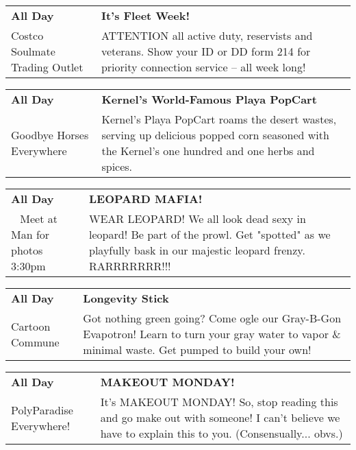 \begin{tabular}{ p{1in} p{2.2in} }
    \textbf{All Day} & \textbf{It's Fleet Week!} \\
    Costco Soulmate Trading Outlet \newline  & ATTENTION all active duty, reservists and veterans. Show your ID or DD form 214 for priority connection service -- all week long! \\
    \hline 
\end{tabular}
    
\begin{tabular}{ p{1in} p{2.2in} }
    \textbf{All Day} & \textbf{Kernel's World-Famous Playa PopCart} \\
    Goodbye Horses \newline Everywhere & Kernel's Playa PopCart roams the desert wastes, serving up delicious popped corn seasoned with the Kernel's one hundred and one herbs and spices. \\
    \hline 
\end{tabular}
    
\begin{tabular}{ p{1in} p{2.2in} }
    \textbf{All Day} & \textbf{LEOPARD MAFIA!} \\
    ~ \newline Meet at Man for photos 3:30pm & WEAR LEOPARD! We all look dead sexy in leopard! Be part of the prowl. Get "spotted" as we playfully bask in our majestic leopard frenzy. RARRRRRRR!!! \\
    \hline 
\end{tabular}
    
\begin{tabular}{ p{1in} p{2.2in} }
    \textbf{All Day} & \textbf{Longevity Stick} \\
    Cartoon Commune \newline  & Got nothing green going? Come ogle our Gray-B-Gon Evapotron! Learn to turn your gray water to vapor \& minimal waste. Get pumped to build your own! \\
    \hline 
\end{tabular}
    
\begin{tabular}{ p{1in} p{2.2in} }
    \textbf{All Day} & \textbf{MAKEOUT MONDAY!} \\
    PolyParadise \newline Everywhere! & It's MAKEOUT MONDAY! So, stop reading this and go make out with someone! I can't believe we have to explain this to you. (Consensually... obvs.) \\
    \hline 
\end{tabular}
    
